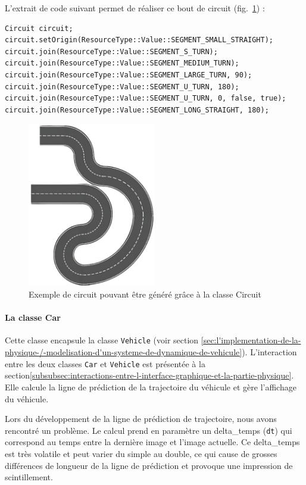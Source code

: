 L'extrait de code suivant permet de réaliser ce bout de circuit (fig.~\ref{fig:example_circuit_1}) :
\begin{lstlisting}[style=CStyle, label={lst:code_circuit}]
Circuit circuit;
circuit.setOrigin(ResourceType::Value::SEGMENT_SMALL_STRAIGHT);
circuit.join(ResourceType::Value::SEGMENT_S_TURN);
circuit.join(ResourceType::Value::SEGMENT_MEDIUM_TURN);
circuit.join(ResourceType::Value::SEGMENT_LARGE_TURN, 90);
circuit.join(ResourceType::Value::SEGMENT_U_TURN, 180);
circuit.join(ResourceType::Value::SEGMENT_U_TURN, 0, false, true);
circuit.join(ResourceType::Value::SEGMENT_LONG_STRAIGHT, 180);
\end{lstlisting}

\begin{figure}[h]
    \centering
    \includegraphics[width=0.5\textwidth]{resources/example_circuit_1}
    \caption{Exemple de circuit pouvant être généré grâce à la classe Circuit}
    \label{fig:example_circuit_1}
\end{figure}

\paragraph[Car]{La classe \textbf{Car}}
Cette classe encapsule la classe \texttt{Vehicle} (voir section \ref{sec:l'implementation-de-la-physique-/-modelisation-d'un-systeme-de-dynamique-de-vehicule}).
L'interaction entre les deux classes \texttt{Car} et \texttt{Vehicle} est présentée à la section\ref{subsubsec:interactions-entre-l-interface-graphique-et-la-partie-physique}.
Elle calcule la ligne de prédiction de la trajectoire du véhicule et gère l'affichage du véhicule.

Lors du développement de la ligne de prédiction de trajectoire, nous avons rencontré un problème.
Le calcul prend en paramètre un \gls{delta_temps} (\texttt{dt}) qui correspond au temps entre la dernière image et l'image actuelle.
Ce \gls{delta_temps} est très volatile et peut varier du simple au double, ce qui cause de grosses différences de longueur de la ligne de prédiction et provoque une impression de scintillement.

